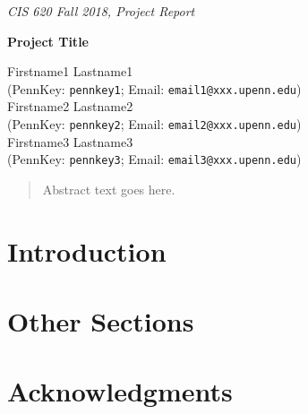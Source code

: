 \documentclass[twoside,11pt]{article}
\renewcommand{\>}{{\rightarrow}}
\newcommand{\1}{{\mathbf 1}}
\newcommand{\0}{{\mathbf 0}}
\begin{document}

\emph{\footnotesize{CIS 620 Fall 2018, Project Report}}

\vspace{12pt}

\begin{center}

\textbf{\Large{Project Title}}

\vspace{12pt}

Firstname1 Lastname1 \\ (PennKey: \texttt{pennkey1}; Email: \texttt{email1@xxx.upenn.edu}) \\[4pt]
Firstname2 Lastname2 \\ (PennKey: \texttt{pennkey2}; Email: \texttt{email2@xxx.upenn.edu}) \\[4pt]
Firstname3 Lastname3 \\ (PennKey: \texttt{pennkey3}; Email: \texttt{email3@xxx.upenn.edu}) 

\end{center}


\begin{abstract}
Abstract text goes here.
\end{abstract}

\vspace{12pt}


\section{Introduction}

\section{Other Sections}

\section*{Acknowledgments}


\newpage



\end{document}
